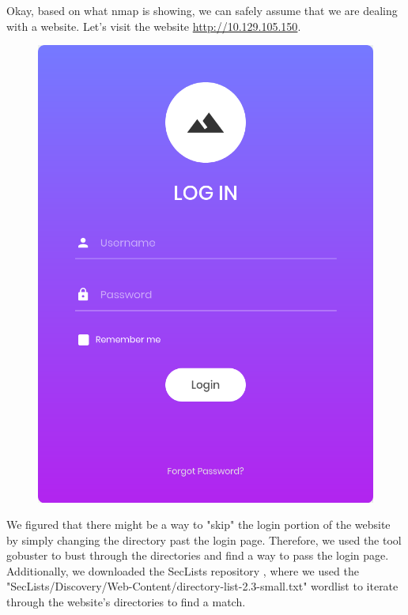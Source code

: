 \documentclass[conference]{IEEEtran}
\begin{document}
Okay, based on what nmap is showing, we can safely assume that we are dealing with a website. Let's visit the website \url{http://10.129.105.150}.

\begin{figure}[htb]
\includegraphics[scale=0.1]{login_display.png}
\centering
\end{figure}


We figured that there might be a way to "skip" the login portion of the website by simply changing the directory past the login page.
Therefore, we used the tool gobuster \cite{gobuster} to bust through the directories and find a way to pass the login page.
Additionally, we downloaded the SecLists repository \cite{seclists}, where we used the "SecLists/Discovery/Web-Content/directory-list-2.3-small.txt" wordlist to iterate through the website's directories to find a match.
\end{document}
